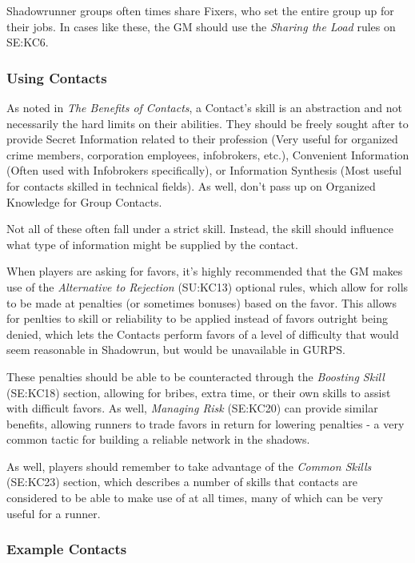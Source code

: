 \begin{multicols}{2}
	Shadowrunner groups often times share Fixers, who set the entire group up for their jobs. In cases like these, the GM should use the \textit{Sharing the Load} rules on SE:KC6.
	
	\subsubsection{Using Contacts}
	
	As noted in \textit{The Benefits of Contacts}, a Contact's skill is an abstraction and not necessarily the hard limits on their abilities. They should be freely sought after to provide Secret Information related to their profession (Very useful for organized crime members, corporation employees, infobrokers, etc.), Convenient Information (Often used with Infobrokers specifically), or Information Synthesis (Most useful for contacts skilled in technical fields). As well, don't pass up on Organized Knowledge for Group Contacts.
	
	Not all of these often fall under a strict skill. Instead, the skill should influence what type of information might be supplied by the contact.
	
	When players are asking for favors, it's highly recommended that the GM makes use of the \textit{Alternative to Rejection} (SU:KC13) optional rules, which allow for rolls to be made at penalties (or sometimes bonuses) based on the favor. This allows for penlties to skill or reliability to be applied instead of favors outright being denied, which lets the Contacts perform favors of a level of difficulty that would seem reasonable in Shadowrun, but would be unavailable in GURPS.
	
	These penalties should be able to be counteracted through the \textit{Boosting Skill} (SE:KC18) section, allowing for bribes, extra time, or their own skills to assist with difficult favors. As well, \textit{Managing Risk} (SE:KC20) can provide similar benefits, allowing runners to trade favors in return for lowering penalties - a very common tactic for building a reliable network in the shadows.
	
	As well, players should remember to take advantage of the \textit{Common Skills} (SE:KC23) section, which describes a number of skills that contacts are considered to be able to make use of at all times, many of which can be very useful for a runner.
	
	\subsubsection{Example Contacts}
	

\end{multicols}
